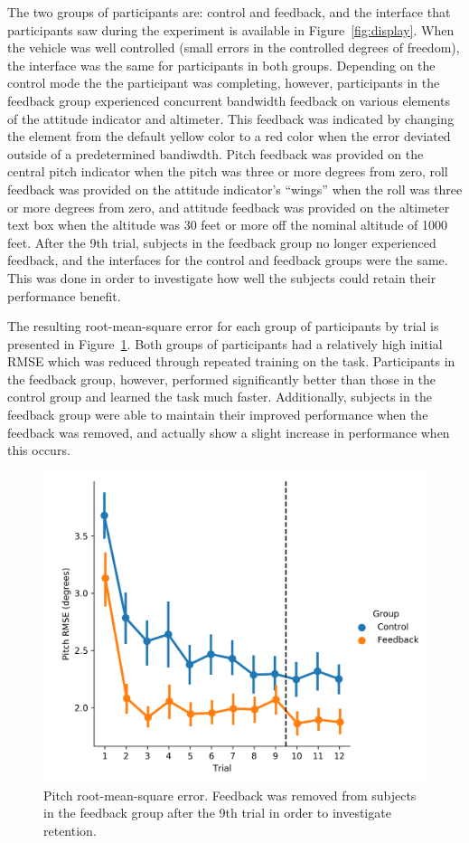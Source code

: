 The two groups of participants are: control and feedback, and the interface that participants saw during the experiment is available in Figure~\ref{fig:display}.
When the vehicle was well controlled (small errors in the controlled degrees of freedom), the interface was the same for participants in both groups.
Depending on the control mode the the participant was completing, however, participants in the feedback group experienced concurrent bandwidth feedback on various elements of the attitude indicator and altimeter.
This feedback was indicated by changing the element from the default yellow color to a red color when the error deviated outside of a predetermined bandiwdth.
Pitch feedback was provided on the central pitch indicator when the pitch was three or more degrees from zero, roll feedback was provided on the attitude indicator's ``wings'' when the roll was three or more degrees from zero, and attitude feedback was provided on the altimeter text box when the altitude was 30 feet or more off the nominal altitude of 1000 feet.
After the 9th trial, subjects in the feedback group no longer experienced feedback, and the interfaces for the control and feedback groups were the same.
This was done in order to investigate how well the subjects could retain their performance benefit.

The resulting root-mean-square error for each group of participants by trial is presented in Figure~\ref{fig:prmse}.
Both groups of participants had a relatively high initial RMSE which was reduced through repeated training on the task.
Participants in the feedback group, however, performed significantly better than those in the control group and learned the task much faster.
Additionally, subjects in the feedback group were able to maintain their improved performance when the feedback was removed, and actually show a slight increase in performance when this occurs.

\begin{figure}[t]
    \centering
    \includegraphics[width=0.8\linewidth]{figures/Modeling/prms_arx.png}
    \caption[Pitch root-mean-square error]{Pitch root-mean-square error. Feedback was removed from subjects in the feedback group after the 9th trial in order to investigate retention.}
    \label{fig:prmse}
\end{figure}


